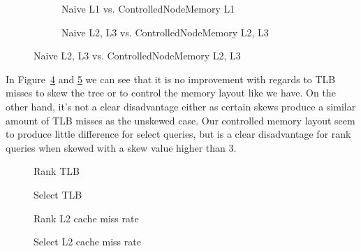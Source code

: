 \begin{figure}
\caption{Select Cache Misses on Wavelet Tree with increasing skew}
\label{fig:NaiveControlledNodeMemorySelectSkewCacheMisses}
\centering
\begin{subfigure}{\textwidth}
	\caption{Naive L1 vs. ControlledNodeMemory L1}
	\label{fig:L1NaiveControlledNodeMemorySelectSkewCacheMisses}
	
	\vspace*{5 mm}
\end{subfigure}
\begin{subfigure}{\textwidth}
	\caption{Naive L2, L3 vs. ControlledNodeMemory L2, L3}
	\label{fig:L2L3NaiveControlledNodeMemorySelectSkewCacheMisses}
 	
\end{subfigure}
\end{figure}


In Figure~\ref{fig:NaiveVsControlledNodeMemorySkewRankQueryTLB} and \ref{fig:NaiveVsControlledNodeMemorySkewSelectQueryTLB} we can see that it is no improvement with regards to TLB misses to skew the tree or to control the memory layout like we have. On the other hand, it's not a clear disadvantage either as certain skews produce a similar amount of TLB misses as the unskewed case. Our controlled memory layout seem to produce little difference for select queries, but is a clear disadvantage for rank queries when skewed with a skew value higher than 3.

\begin{figure}
\caption{Rank TLB}
\label{fig:NaiveVsControlledNodeMemorySkewRankQueryTLB}

\end{figure}

\begin{figure}
\caption{Select TLB}
\label{fig:NaiveVsControlledNodeMemorySkewSelectQueryTLB}

\end{figure}


\begin{figure}
\caption{Rank L2 cache miss rate}
\label{fig:NaiveVsControlledNodeMemorySkewRankQuery_L2_DCMrate}

\end{figure}

\begin{figure}
\caption{Select L2 cache miss rate}
\label{fig:NaiveVsControlledNodeMemorySkewSelectQuery_L2_DCMrate}

\end{figure}

